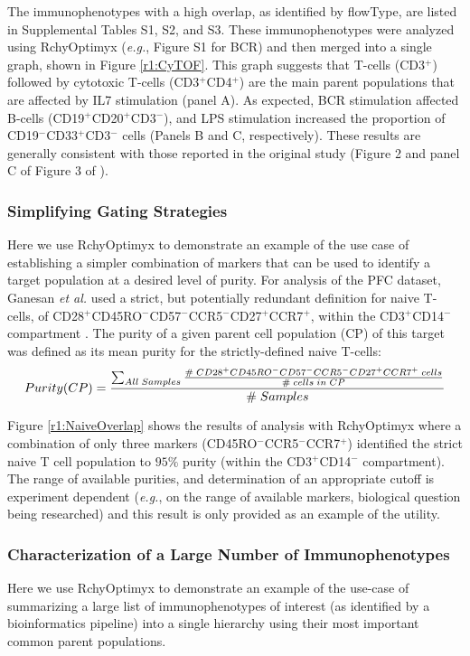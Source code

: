 The immunophenotypes with a high overlap, as identified by flowType, are listed in Supplemental Tables S1, S2, and S3.
These immunophenotypes were analyzed using RchyOptimyx (\emph{e.g.}, Figure S1 for BCR) and then merged into a single graph, shown in Figure \ref{r1:CyTOF}.
This graph suggests that T-cells (CD3$^+$) followed by cytotoxic T-cells (CD3$^+$CD4$^+$) are the main parent populations that are affected by IL7 stimulation (panel A).
As expected, BCR stimulation affected B-cells (CD19$^+$CD20$^+$CD3$^-$), and LPS stimulation increased the proportion of CD19$^-$CD33$^+$CD3$^-$ cells (Panels B and C, respectively).
These results are generally consistent with those reported in the original study (Figure 2 and panel C of Figure 3 of \cite{bendall2011single}).


\subsubsection{Simplifying Gating Strategies}

Here we use RchyOptimyx to demonstrate  an example of the use case of establishing  a simpler combination of markers that can be used to  identify a target population at a desired level of purity. 
For analysis of the PFC dataset, Ganesan \emph{et al.} used a strict, but potentially redundant definition for naive T-cells, of CD28$^+$CD45RO$^-$CD57$^-$CCR5$^-$CD27$^+$CCR7$^+$, within the CD3$^+$CD14$^-$ compartment \cite{Ganesan2010Immunologic}.
The purity of a given parent cell population (CP) of  this target was defined as its mean purity for the strictly-defined naive T-cells:
\begin{equation}\small
  Purity(CP)=\frac{\sum_{All \; Samples}\frac{\# \; CD28^+ CD45RO^- CD57^- CCR5^- CD27^+ CCR7^+ \; cells}{\# \; cells \; in \; CP}}{\# \; Samples}
\end{equation}

Figure \ref{r1:NaiveOverlap} shows the results of analysis with RchyOptimyx where a combination of only three markers (CD45RO$^-$CCR5$^-$CCR7$^+$) identified the strict naive T cell population to $95\%$ purity (within the CD3$^+$CD14$^-$ compartment).
The range of available purities, and determination of an appropriate cutoff is experiment dependent (\emph{e.g.}, on the range of available markers, biological question being researched) and this result is only provided as an example of the utility. 


\subsubsection{Characterization of a Large Number of Immunophenotypes}
Here we use RchyOptimyx to demonstrate an example of the use-case of summarizing a large list of immunophenotypes of interest (as identified by a bioinformatics pipeline) into a single hierarchy using their most important common parent populations.

